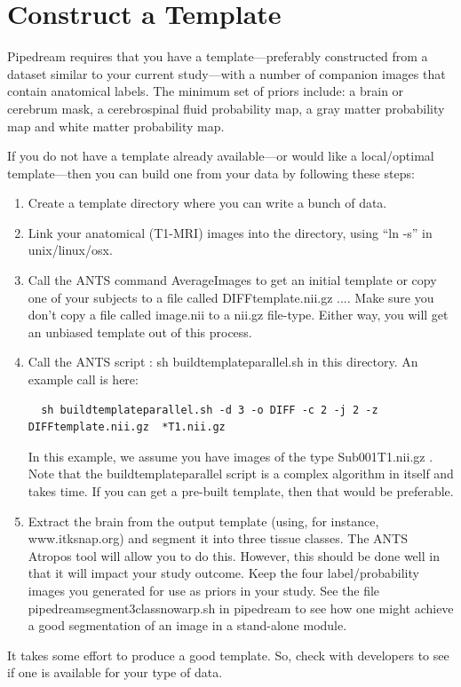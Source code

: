 \documentclass{InsightArticle}
\begin{document}
\section{Construct a Template}
Pipedream requires that you have a template---preferably constructed
from a dataset similar to your current study---with a number of
companion images that contain anatomical labels.  The minimum set of
priors include: a brain or cerebrum mask, a cerebrospinal fluid
probability map, a gray matter probability map and white matter
probability map.

If you do not have a template already available---or would like a local/optimal 
template---then you can build one from your data by following these steps:
\begin{enumerate}
\item Create a template directory where you can write a bunch of data.
\item Link your anatomical (T1-MRI) images into the directory, using ``ln -s'' in unix/linux/osx.
\item Call the ANTS command AverageImages to get an initial template
  or copy one of your subjects to a file called DIFFtemplate.nii.gz
  .... Make sure you don't copy a file called image.nii to a nii.gz
  file-type.  Either way, you will get an unbiased template out of this process.  
\item Call the ANTS script :   sh buildtemplateparallel.sh in this directory.  
  An example call is here: 
\begin{verbatim}
  sh buildtemplateparallel.sh -d 3 -o DIFF -c 2 -j 2 -z DIFFtemplate.nii.gz  *T1.nii.gz 
\end{verbatim}
  In this example, we assume you have images of the type   Sub001T1.nii.gz .
  Note that the buildtemplateparallel script is a complex algorithm in itself and takes time.  
  If you can get a pre-built template, then that would be preferable. 
\item  Extract the brain from the output template (using, for instance, www.itksnap.org) and segment it into three tissue classes.  
  The ANTS Atropos tool will allow you to do this.  However, this should be done well in that 
  it will impact your study outcome.   Keep the four label/probability images you generated for use as priors in your study. 
  See the file pipedreamsegment3classnowarp.sh in pipedream to see how one might achieve a good segmentation of an image 
  in a stand-alone module.  
\end{enumerate}
It takes some effort to produce a good template.  So, check with developers to see 
if one is available for your type of data.
\end{document}
